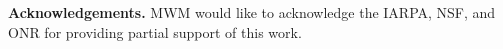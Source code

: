 \documentclass[aos]{imsart}
\numberwithin{equation}{section}
\theoremstyle{plain}
\begin{document}
\vspace{5mm}
\noindent
\textbf{Acknowledgements.}
MWM would like to acknowledge the IARPA, NSF, and ONR for providing partial support of this work.




 




\end{document}
